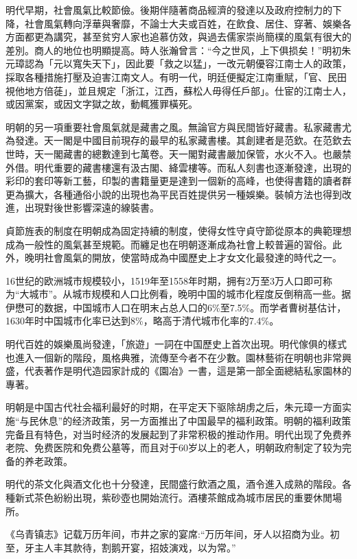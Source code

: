 明代早期，社會風氣比較節儉。後期伴隨著商品經濟的發達以及政府控制力的下降，社會風氣轉向浮華與奢靡，不論士大夫或百姓，在飲食、居住、穿著、娛樂各方面都更為講究，甚至贫穷人家也追慕仿效，與過去儒家崇尚簡樸的風氣有很大的差別。商人的地位也明顯提高。時人张瀚曾言：“今之世风，上下俱损矣！”明初朱元璋認為「元以寬失天下」，因此要「救之以猛」，一改元朝優容江南士人的政策，採取各種措施打壓及迫害江南文人。有明一代，明廷便擬定江南重賦，「官、民田視他地方倍蓗」，並且規定「浙江，江西，蘇松人毋得任戶部」。仕宦的江南士人，或因黨案，或因文字獄之故，動輒獲罪橫死。

明朝的另一項重要社會風氣就是藏書之風。無論官方與民間皆好藏書。私家藏書尤為發達。天一閣是中國目前現存的最早的私家藏書樓。其創建者是范欽。在范欽去世時，天一閣藏書的總數達到七萬卷。天一閣對藏書嚴加保管，水火不入。也嚴禁外借。明代重要的藏書樓還有汲古閣、絳雲樓等。而私人刻書也逐漸發達，出現的彩印的套印等新工藝，印製的書籍量更是達到一個新的高峰，也使得書籍的讀者群更為擴大，各種通俗小說的出現也為平民百姓提供另一種娛樂。裝幀方法也得到改進，出現對後世影響深遠的線裝書。

貞節旌表的制度在明朝成為固定持續的制度，使得女性守貞守節從原本的典範理想成為一般性的風氣甚至規範。而纏足也在明朝逐漸成為社會上較普遍的習俗。此外，晚明社會風氣的開放，使當時成為中國歷史上才女文化最發達的時代之一。

16世纪的欧洲城市规模较小，1519年至1558年时期，拥有2万至3万人口即可称为“大城市”。从城市规模和人口比例看，晚明中国的城市化程度反倒稍高一些。据伊懋可的数据，中国城市人口在明末占总人口的6\%至7.5\%。而学者曹树基估计，1630年时中国城市化率已达到8\%，略高于清代城市化率的7.4\%。

明代百姓的娛樂風尚發達，「旅遊」一詞在中国歷史上首次出現。明代傢俱的樣式也進入一個新的階段，風格典雅，流傳至今者不在少數。園林藝術在明朝也非常興盛，代表著作是明代造园家計成的《園冶》一書，這是第一部全面總結私家園林的專著。

明朝是中国古代社会福利最好的时期，在平定天下驱除胡虏之后，朱元璋一方面实施“与民休息”的经济政策，另一方面推出了中国最早的福利政策。明朝的福利政策完备且有特色，对当时经济的发展起到了非常积极的推动作用。明代出现了免费养老院、免费医院和免费公墓等，而且对于60岁以上的老人，明朝政府制定了较为完备的养老政策。

明代的茶文化與酒文化也十分發達，民間盛行飲酒之風，酒令進入成熟的階段。各種新式茶色紛紛出現，紫砂壺也開始流行。酒樓茶館成為城市居民的重要休閒場所。

《乌青镇志》记载万历年间，市井之家的宴席:“万历年间，牙人以招商为业。初至，牙主人丰其款待，割鹅开宴，招妓演戏，以为常。”

